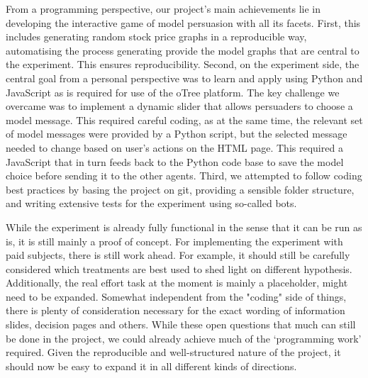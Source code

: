 \documentclass[11pt, a4paper, leqno]{article}
\begin{document}
From a programming perspective, our project's main achievements lie in developing the interactive game of model persuasion with all its facets. First, this includes generating random stock price graphs in a reproducible way, automatising the process generating provide the model graphs that are central to the experiment. This ensures reproducibility. Second, on the experiment side, the central goal from a personal perspective was to learn and apply using Python and JavaScript as is required for use of the oTree platform. The key challenge we overcame was to implement a dynamic slider that allows persuaders to choose a model message. This required careful coding, as at the same time, the relevant set of model messages were provided by a Python script, but the selected message needed to change based on user's actions on the HTML page. This required a JavaScript that in turn feeds back to the Python code base to save the model choice before sending it to the other agents.
Third, we attempted to follow coding best practices by basing the project on git, providing a sensible folder structure, and writing extensive tests for the experiment using so-called bots.

While the experiment is already fully functional in the sense that it can be run as is, it is still mainly a proof of concept. For implementing the experiment with paid subjects, there is still work ahead. For example, it should still be carefully considered which treatments are best used to shed light on different hypothesis. Additionally, the real effort task at the moment is mainly a placeholder, might need to be expanded. Somewhat independent from the "coding" side of things, there is plenty of consideration necessary for the exact wording of information slides, decision pages and others. While these open questions that much can still be done in the project, we could already achieve much of the `programming work' required. Given the reproducible and well-structured nature of the project, it should now be easy to expand it in all different kinds of directions.








\end{document}
